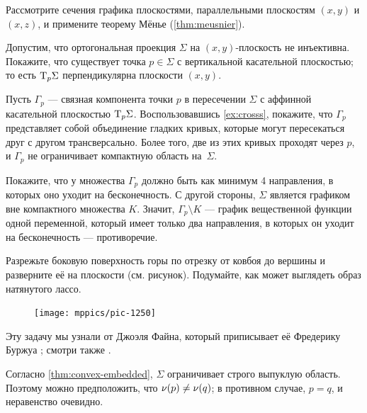 \begin{multicols}{2}
Рассмотрите сечения графика плоскостями, параллельными плоскостям $(x,y)$ и $(x,z)$, и примените теорему Мёнье (\ref{thm:meusnier}).

Допустим, что ортогональная проекция $\Sigma$ на $(x,y)$-плоскость не инъективна.
Покажите, что существует точка $p\in\Sigma$ с вертикальной касательной плоскостью;
то есть $\mathrm{T}_p\Sigma$ перпендикулярна плоскости $(x,y)$.

Пусть $\Gamma_p$ --- связная компонента точки $p$ в пересечении $\Sigma$ с аффинной касательной плоскостью $\mathrm{T}_p\Sigma$.
Воспользовавшись \ref{ex:crosss}, покажите, что $\Gamma_p$ представляет собой объединение гладких кривых, которые могут пересекаться друг с другом трансверсально.
Более того, две из этих кривых проходят через $p$, и $\Gamma_p$ не ограничивает компактную область на~$\Sigma$.

Покажите, что у множества $\Gamma_p$ должно быть как минимум 4 направления, в которых оно уходит на бесконечность.
С другой стороны, $\Sigma$ является графиком вне компактного множества $K$.
Значит, $\Gamma_p\setminus K$ --- график вещественной функции одной переменной, который имеет только два направления, в которых он уходит на бесконечность --- противоречие.


\setcounter{eqtn}{0}

Разрежьте боковую поверхность горы по отрезку от ковбоя до вершины и
разверните её на плоскости (см. рисунок).
Подумайте, как может выглядеть образ натянутого лассо.

\begin{figure}
\vskip-4mm
\centering
\texttt{[image: mppics/pic-1250]}
\vskip-4mm
\end{figure}

Эту задачу мы узнали от Джоэля Файна, который приписывает её Фредерику Буржуа \cite{fine};
смотри также \cite[Problem 12]{khesin-tabachnikov}.

Согласно \ref{thm:convex-embedded}, $\Sigma$ ограничивает строго выпуклую область.
Поэтому можно предположить, что $\nu(p)\ne\nu(q)$; в противном случае, $p=q$, и неравенство очевидно.


\end{multicols}
